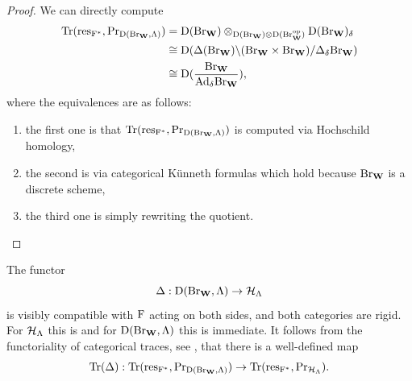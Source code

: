 \documentclass[article, 10pt, oneside, reqno]{amsart}
\theoremstyle{plain}
\theoremstyle{definition}
\theoremstyle{remark}
\newcommand{\Prr}{\mathrm{Pr}}
\newcommand{\restr}{\mathrm{res}}
\begin{document}
\begin{proof}
We can directly compute 
\begin{align*}
\Tr(\restr_{\Frob^*}, \Prr_{\DD(\Br_{\Wbf}, \Lambda)}) &= \DD(\Br_{\Wbf}) \otimes_{\DD(\Br_{\Wbf}) \otimes \DD(\Br_{\Wbf}^{\opp})} \DD(\Br_{\Wbf})_{\delta} \\
&\cong \DD(\Delta(\Br_{\Wbf}) \backslash (\Br_{\Wbf} \times \Br_{\Wbf})/\Delta_{\delta}\Br_{\Wbf}) \\
&\cong \DD(\frac{\Br_{\Wbf}}{\Ad_{\delta}\Br_{\Wbf}}),
\end{align*}
where the equivalences are as follows:
\begin{enumerate}
\item the first one is that $\Tr(\restr_{\Frob^*}, \Prr_{\DD(\Br_{\Wbf}, \Lambda)})$ is computed via Hochschild homology, 
\item the second is via categorical Künneth formulas which hold because $\mathrm{Br}_{\mathbf{W}}$ is a discrete scheme, 
\item the third one is simply rewriting the quotient.
\end{enumerate}
\end{proof}

The functor 
$$\Delta : \mathrm{D}(\mathrm{Br}_{\mathbf{W}}, \Lambda) \to \mathcal{H}_{\Lambda}$$ 
is visibly compatible with $\mathrm{F}$ acting on both sides, and both categories are rigid. For $\mathcal{H}_{\Lambda}$ this is \cite[Theorem 4.4.2]{EteveFreeMono} and for $\mathrm{D}(\mathrm{Br}_{\mathbf{W}}, \Lambda)$ this is immediate. It follows from the functoriality of categorical traces, see \cite[Section 3.6]{ToyModel}, that there is a well-defined map 
$$\Tr(\Delta) : \Tr(\restr_{\Frob^*}, \Prr_{\DD(\Br_{\Wbf}, \Lambda)}) \to \Tr(\restr_{\Frob^*}, \Prr_{\Hcal_{\Lambda}}).$$
\end{document}
